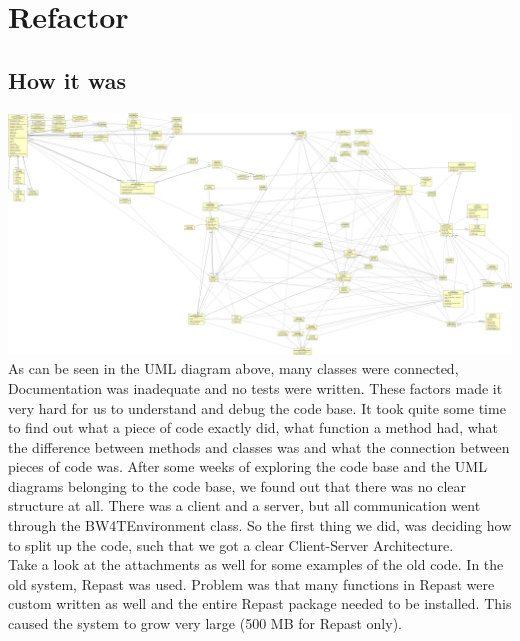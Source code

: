 \section{Refactor}
\subsection{How it was}
\includegraphics[width=\linewidth]{Transferability/old.png}
As can be seen in the UML diagram above, many classes were connected, Documentation was inadequate and no tests were written. These factors made it very hard for us to understand and debug the code base.
It took quite some time to find out what a piece of code exactly did, what function a method had, what the difference between methods and classes was and what the connection between pieces of code was.
After some weeks of exploring the code base and the UML diagrams belonging to the code base, we found out that there was no clear structure at all. There was a client and a server, but all communication went through the BW4TEnvironment class. So the first thing we did, was deciding how to split up the code, such that we got a clear Client-Server Architecture. \\
\indent Take a look at the attachments as well for some examples of the old code.
In the old system, Repast was used. Problem was that many functions in Repast were custom written as well and the entire Repast package needed to be installed. This caused the system to grow very large (500 MB for Repast only).

